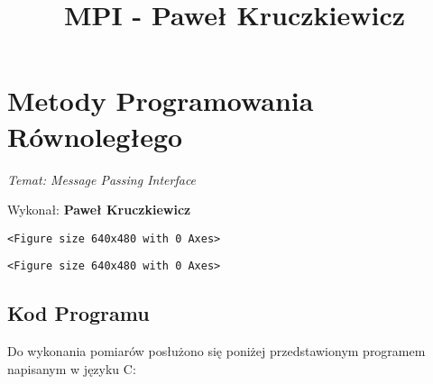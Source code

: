 \documentclass[11pt]{article}
\title{MPI - Paweł Kruczkiewicz}
\begin{document}
    
    \maketitle
    
    

    
    \hypertarget{metody-programowania-ruxf3wnolegux142ego}{%
\section{Metody Programowania
Równoległego}\label{metody-programowania-ruxf3wnolegux142ego}}

\emph{Temat: Message Passing Interface}

Wykonał: \textbf{Paweł Kruczkiewicz}

            \begin{tcolorbox}[breakable, size=fbox, boxrule=.5pt, pad at break*=1mm, opacityfill=0]
\begin{Verbatim}[commandchars=\\\{\}]
<Figure size 640x480 with 0 Axes>
\end{Verbatim}
\end{tcolorbox}
        
    
    \begin{Verbatim}[commandchars=\\\{\}]
<Figure size 640x480 with 0 Axes>
    \end{Verbatim}

    
    \hypertarget{kod-programu}{%
\subsection{Kod Programu}\label{kod-programu}}

Do wykonania pomiarów posłużono się poniżej przedstawionym programem
napisanym w języku C:
\end{document}
